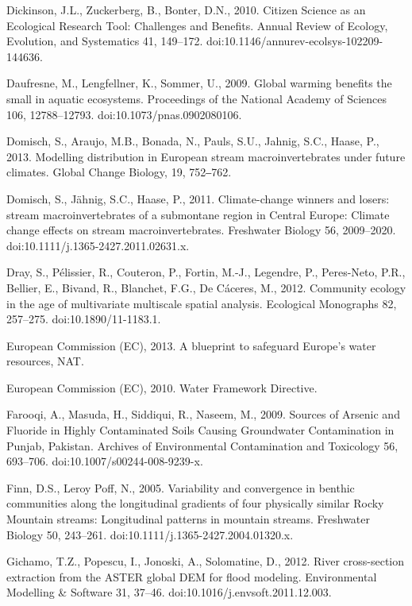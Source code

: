 \begin{thebibliography}
\bibitem{} \hangindent=1cm Dickinson, J.L., Zuckerberg, B., Bonter, D.N., 2010. Citizen Science as an Ecological Research Tool: Challenges and Benefits. Annual Review of Ecology, Evolution, and Systematics 41, 149–172. doi:10.1146/annurev-ecolsys-102209-144636.

\bibitem{} \hangindent=1cm Daufresne, M., Lengfellner, K., Sommer, U., 2009. Global warming benefits the small in aquatic ecosystems. Proceedings of the National Academy of Sciences 106, 12788–12793. doi:10.1073/pnas.0902080106.

\bibitem{} \hangindent=1cm Domisch, S., Araujo, M.B., Bonada, N., Pauls, S.U., Jahnig, S.C., Haase, P., 2013. Modelling distribution in European stream macroinvertebrates under future climates. Global Change Biology, 19, 752‒762.

\bibitem{} \hangindent=1cm Domisch, S., Jähnig, S.C., Haase, P., 2011. Climate-change winners and losers: stream macroinvertebrates of a submontane region in Central Europe: Climate change effects on stream macroinvertebrates. Freshwater Biology 56, 2009–2020. doi:10.1111/j.1365-2427.2011.02631.x.

\bibitem{} \hangindent=1cm Dray, S., Pélissier, R., Couteron, P., Fortin, M.-J., Legendre, P., Peres-Neto, P.R., Bellier, E., Bivand, R., Blanchet, F.G., De Cáceres, M., 2012. Community ecology in the age of multivariate multiscale spatial analysis. Ecological Monographs 82, 257–275. doi:10.1890/11-1183.1.

\bibitem{} \hangindent=1cm European Commission (EC), 2013. A blueprint to safeguard Europe’s water resources, NAT.

\bibitem{} \hangindent=1cm European Commission (EC), 2010. Water Framework Directive.

\bibitem{} \hangindent=1cm Farooqi, A., Masuda, H., Siddiqui, R., Naseem, M., 2009. Sources of Arsenic and Fluoride in Highly Contaminated Soils Causing Groundwater Contamination in Punjab, Pakistan. Archives of Environmental Contamination and Toxicology 56, 693–706. doi:10.1007/s00244-008-9239-x.

\bibitem{} \hangindent=1cm Finn, D.S., Leroy Poff, N., 2005. Variability and convergence in benthic communities along the longitudinal gradients of four physically similar Rocky Mountain streams: Longitudinal patterns in mountain streams. Freshwater Biology 50, 243–261. doi:10.1111/j.1365-2427.2004.01320.x.

\bibitem{} \hangindent=1cm Gichamo, T.Z., Popescu, I., Jonoski, A., Solomatine, D., 2012. River cross-section extraction from the ASTER global DEM for flood modeling. Environmental Modelling & Software 31, 37–46. doi:10.1016/j.envsoft.2011.12.003.


\end{thebibliography}
